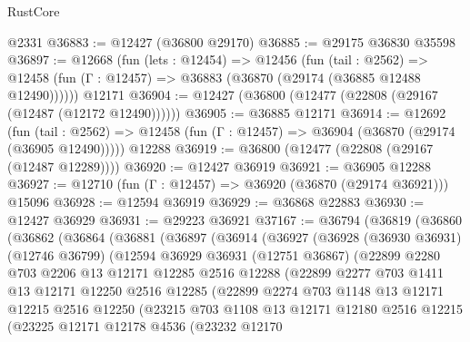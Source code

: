 \begin{lexlean}{RustCore}
\begin{coremodule}
    @2331
@36883 := @12427 (@36800 @29170)
@36885 := @29175 @36830 @35598
@36897 := @12668
    (fun (lets : @12454) =>
    @12456
      (fun (tail : @2562) =>
      @12458 (fun (Γ : @12457) => @36883 (@36870 (@29174 (@36885 @12488 @12490))))))
    @12171
@36904 := @12427 (@36800 (@12477 (@22808 (@29167 (@12487 (@12172 @12490))))))
@36905 := @36885 @12171
@36914 := @12692
    (fun (tail : @2562) => @12458 (fun (Γ : @12457) => @36904 (@36870 (@29174 (@36905 @12490)))))
    @12288
@36919 := @36800 (@12477 (@22808 (@29167 (@12487 @12289))))
@36920 := @12427 @36919
@36921 := @36905 @12288
@36927 := @12710 (fun (Γ : @12457) => @36920 (@36870 (@29174 @36921))) @15096
@36928 := @12594 @36919
@36929 := @36868 @22883
@36930 := @12427 @36929
@36931 := @29223 @36921
@37167 := @36794
    (@36819
      (@36860
        (@36862
          (@36864
            (@36881
              (@36897
                (@36914
                  (@36927
                    (@36928
                      (@36930 @36931)
                      (@12746 @36799)
                      (@12594
                        @36929
                        @36931
                        (@12751 @36867)
                        (@22899
                          @2280
                          @703
                          @2206
                          @13
                          @12171
                          @12285
                          @2516
                          @12288
                          (@22899
                            @2277
                            @703
                            @1411
                            @13
                            @12171
                            @12250
                            @2516
                            @12285
                            (@22899
                              @2274
                              @703
                              @1148
                              @13
                              @12171
                              @12215
                              @2516
                              @12250
                              (@23215
                                @703
                                @1108
                                @13
                                @12171
                                @12180
                                @2516
                                @12215
                                (@23225
                                  @12171
                                  @12178
                                  @4536
                                  (@23232
                                    @12170

\end{coremodule}
\end{lexlean}
